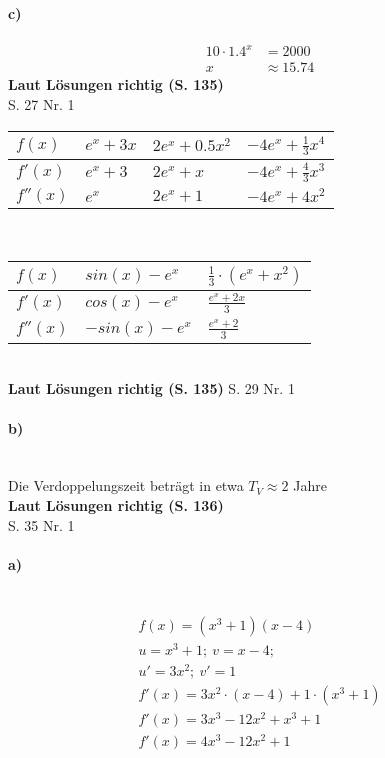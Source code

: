 \documentclass[12pt,a4paper]{report}
\newcommand{\richtig}[1]{\color{ForestGreen}\textbf{
	Laut Lösungen richtig (S. #1)
}\color{black}}
\begin{document}
	\paragraph{c)}
	\begin{align*}
		10 \cdot 1.4^x &= 2000 \\
		x &\approx 15.74
	\end{align*}
	\richtig{135}
	\\[0.5cm]
	\Large S. 27 Nr. 1
	\large
	\noindent \\[0.5cm]
	\begin{tabularx}{\linewidth}{|X|X|X|X|}
		\hline
		$f(x)$ & $e^x + 3x$ & $2e^x + 0.5x^2$ & $-4e^x + \frac{1}{3}x^4$ \\
		\hline
		$f'(x)$ & $e^x + 3$ & $2e^x + x$ & $-4e^x + \frac{4}{3}x^3$ \\
		\hline
		$f''(x)$ & $e^x$ & $2e^x + 1$ & $-4e^x + 4x^2$ \\
		\hline
	\end{tabularx}
	\\[1cm]
	\noindent
	\begin{tabularx}{\linewidth}{|X|X|X|}
		\hline
		$f(x)$ & $sin(x) - e^x$ & $\frac{1}{3}\cdot(e^x+x^2)$ \\
		\hline
		$f'(x)$ & $cos(x) - e^x$ & $\frac{e^x + 2x}{3} $\\
		\hline
		$f''(x)$ & $-sin(x) - e^x$ & $\frac{e^x + 2}{3} $\\
		\hline
	\end{tabularx}
	\\[1cm]
	\richtig{135} \newpage
	\noindent
	\Large S. 29 Nr. 1
	\large
	\noindent
	\paragraph{b)} \mbox{} \\
	Die Verdoppelungszeit beträgt in etwa $T_V \approx 2$ Jahre \\[0.2cm]
	\noindent
	\richtig{136}
	\noindent \\[0.5cm]
	\Large S. 35 Nr. 1
	\large
	\noindent
	\paragraph{a)} \mbox{} \\
	\begin{align*}
		f(x) = (x^3 + 1)(x - 4) \\
		u =x^3 + 1;\ v = x-4;\\
		u'=3x^2;\ v'=1 \\
		f'(x) = 3x^2 \cdot (x-4) + 1\cdot (x^3 + 1) \\
		f'(x) = 3x^3 - 12x^2 + x^3 + 1 \\
		f'(x) = 4x^3 - 12x^2 + 1
	\end{align*}
\end{document}
